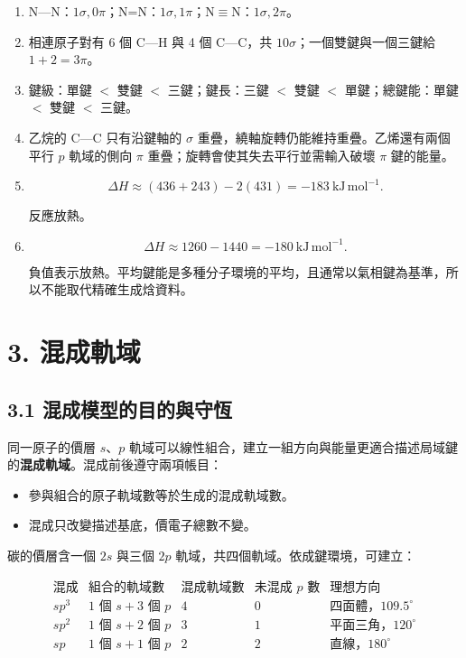 \documentclass[11pt,a4paper]{article}
\providecommand{\tightlist}{%
  \setlength{\itemsep}{0pt}\setlength{\parskip}{0pt}}
\begin{document}
\begin{enumerate}
\def\labelenumi{\arabic{enumi}.}
\item
  N---N：\(1\sigma,0\pi\)；N=N：\(1\sigma,1\pi\)；N\(\equiv\)N：\(1\sigma,2\pi\)。
\item
  相連原子對有 6 個 C---H 與 4 個 C---C，共 \(10\sigma\)；一個雙鍵與一個三鍵給 \(1+2=3\pi\)。
\item
  鍵級：單鍵 \(<\) 雙鍵 \(<\) 三鍵；鍵長：三鍵 \(<\) 雙鍵 \(<\) 單鍵；總鍵能：單鍵 \(<\) 雙鍵 \(<\) 三鍵。
\item
  乙烷的 C---C 只有沿鍵軸的 \(\sigma\) 重疊，繞軸旋轉仍能維持重疊。乙烯還有兩個平行 \(p\) 軌域的側向 \(\pi\) 重疊；旋轉會使其失去平行並需輸入破壞 \(\pi\) 鍵的能量。
\item
  \[
  \Delta H\approx(436+243)-2(431)=-183\ \mathrm{kJ\,mol^{-1}}.
  \]

  反應放熱。
\item
  \[
  \Delta H\approx1260-1440=-180\ \mathrm{kJ\,mol^{-1}}.
  \]

  負值表示放熱。平均鍵能是多種分子環境的平均，且通常以氣相鍵為基準，所以不能取代精確生成焓資料。
\end{enumerate}

\section{3. 混成軌域}\label{ux6df7ux6210ux8eccux57df}

\subsection{3.1 混成模型的目的與守恆}\label{ux6df7ux6210ux6a21ux578bux7684ux76eeux7684ux8207ux5b88ux6046}

同一原子的價層 \(s\)、\(p\) 軌域可以線性組合，建立一組方向與能量更適合描述局域鍵的\textbf{混成軌域}。混成前後遵守兩項帳目：

\begin{itemize}
\tightlist
\item
  參與組合的原子軌域數等於生成的混成軌域數。
\item
  混成只改變描述基底，價電子總數不變。
\end{itemize}

碳的價層含一個 \(2s\) 與三個 \(2p\) 軌域，共四個軌域。依成鍵環境，可建立：

\[
\begin{array}{c|c|c|c|c}
\text{混成} & \text{組合的軌域數} & \text{混成軌域數} & \text{未混成 }p\text{ 數} & \text{理想方向}\\ \hline
sp^3 & \text{1 個 }s+\text{3 個 }p & 4 & 0 & \text{四面體，}109.5^\circ\\
sp^2 & \text{1 個 }s+\text{2 個 }p & 3 & 1 & \text{平面三角，}120^\circ\\
sp & \text{1 個 }s+\text{1 個 }p & 2 & 2 & \text{直線，}180^\circ
\end{array}
\]
\end{document}
